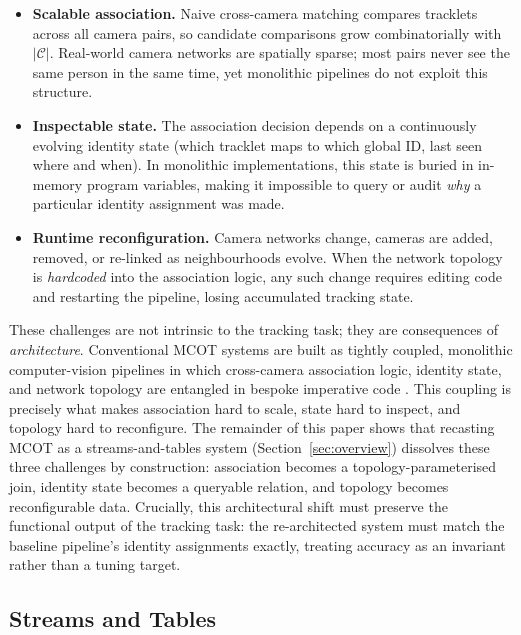 \documentclass[review]{elsarticle}
\begin{document}
\begin{itemize}[leftmargin=*]
    \item \textbf{Scalable association.} Naive cross-camera matching compares tracklets across all camera pairs, so candidate comparisons grow combinatorially with $|\mathcal{C}|$. Real-world camera networks are spatially sparse; most pairs never see the same person in the same time, yet monolithic pipelines do not exploit this structure.
    \item \textbf{Inspectable state.} The association decision depends on a continuously evolving identity state (which tracklet maps to which global ID, last seen where and when). In monolithic implementations, this state is buried in in-memory program variables, making it impossible to query or audit \emph{why} a particular identity assignment was made.
    \item \textbf{Runtime reconfiguration.} Camera networks change, cameras are added, removed, or re-linked as neighbourhoods evolve. When the network topology is \emph{hardcoded} into the association logic, any such change requires editing code and restarting the pipeline, losing accumulated tracking state.
\end{itemize}

These challenges are not intrinsic to the tracking task; they are consequences of
\emph{architecture}. Conventional MCOT systems are built as tightly coupled, monolithic
computer-vision pipelines in which cross-camera association logic, identity state, and network topology are entangled in bespoke imperative code . This coupling is precisely what makes association hard to scale, state hard to inspect, and topology hard to reconfigure. The remainder of this paper shows that recasting MCOT as a streams-and-tables system (Section~\ref{sec:overview}) dissolves these three challenges by construction: association becomes a topology-parameterised join, identity state becomes a queryable relation, and topology becomes reconfigurable data. Crucially, this architectural shift must preserve the functional output of the tracking task: the re-architected system must match the baseline pipeline's identity assignments exactly, treating accuracy as an invariant rather than a tuning target.




\subsection{Streams and Tables}
\label{sec:stream:table:duality}
\end{document}
